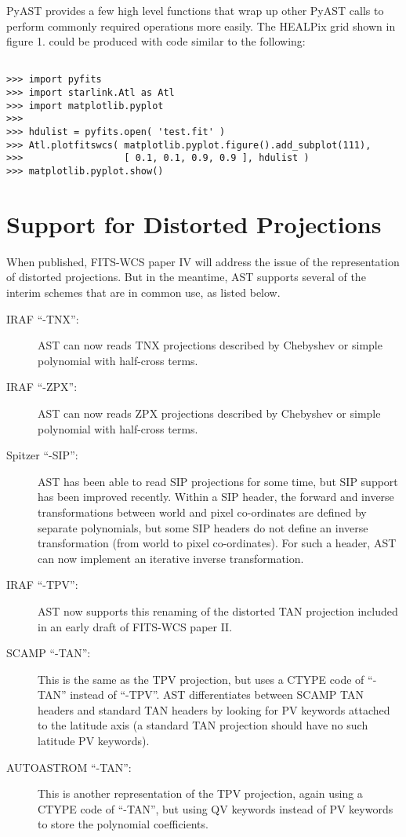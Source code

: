 \documentclass[11pt,twoside]{article}
\begin{document}
PyAST provides a few high level functions that wrap up other PyAST calls
to perform commonly required operations more easily. The HEALPix
grid \citep{HEALPIX}
shown in figure 1. could be produced with code similar to the following:

\begin{minipage}[b]{\linewidth}
\begin{verbatim}

>>> import pyfits
>>> import starlink.Atl as Atl
>>> import matplotlib.pyplot
>>>
>>> hdulist = pyfits.open( 'test.fit' )
>>> Atl.plotfitswcs( matplotlib.pyplot.figure().add_subplot(111),
>>>                  [ 0.1, 0.1, 0.9, 0.9 ], hdulist )
>>> matplotlib.pyplot.show()

\end{verbatim}
\end{minipage}



\section{Support for Distorted Projections}
When published, FITS-WCS paper IV will address the issue of the
representation of distorted projections. But in the meantime, AST
supports several of the interim schemes that are in common use, as listed
below.

\begin{description}
\item[IRAF ``-TNX'':] AST can now reads TNX projections described by Chebyshev or simple polynomial with half-cross terms.
\item[IRAF ``-ZPX'':] AST can now reads ZPX projections described by Chebyshev or simple polynomial with half-cross terms.
\item[Spitzer ``-SIP'':] AST has been able to read SIP projections \citep{SIP} for
some time, but SIP support has been improved recently. Within a SIP
header, the forward and inverse transformations between world and pixel co-ordinates are defined by separate polynomials, but some SIP headers do not define an inverse transformation (from world to pixel co-ordinates). For such a header, AST can now implement an iterative inverse transformation.
\item[IRAF ``-TPV'':] AST now supports this renaming of the distorted TAN projection included in an early draft of FITS-WCS paper II.
\item[SCAMP ``-TAN'':] This is the same as the TPV projection, but
uses a CTYPE code of ``-TAN'' instead of ``-TPV''. AST differentiates
between SCAMP \citep{SCAMP} TAN headers and standard TAN headers by looking for PV
keywords attached to the latitude axis (a standard TAN projection should
have no such latitude PV keywords).
\item[AUTOASTROM ``-TAN'':] This is another representation of the TPV
projection, again using a CTYPE code of ``-TAN'', but using QV keywords instead of PV keywords to store the polynomial coefficients.
\end{description}
\end{document}
